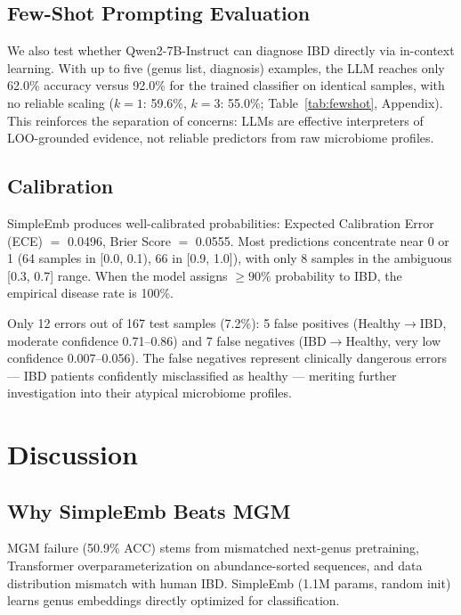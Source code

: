 \documentclass{article} %
\begin{document}
\subsection{Few-Shot Prompting Evaluation}

We also test whether Qwen2-7B-Instruct can diagnose IBD directly via in-context learning. With up to five (genus list, diagnosis) examples, the LLM reaches only 62.0\% accuracy versus 92.0\% for the trained classifier on identical samples, with no reliable scaling ($k{=}1$: 59.6\%, $k{=}3$: 55.0\%; Table~\ref{tab:fewshot}, Appendix). This reinforces the separation of concerns: LLMs are effective interpreters of LOO-grounded evidence, not reliable predictors from raw microbiome profiles.





\subsection{Calibration}

SimpleEmb produces well-calibrated probabilities: Expected Calibration Error (ECE) $=$ 0.0496, Brier Score $=$ 0.0555. Most predictions concentrate near 0 or 1 (64 samples in [0.0, 0.1), 66 in [0.9, 1.0]), with only 8 samples in the ambiguous [0.3, 0.7] range. When the model assigns ${\geq}90\%$ probability to IBD, the empirical disease rate is 100\%.

Only 12 errors out of 167 test samples (7.2\%): 5 false positives (Healthy$\rightarrow$IBD, moderate confidence 0.71--0.86) and 7 false negatives (IBD$\rightarrow$Healthy, very low confidence 0.007--0.056). The false negatives represent clinically dangerous errors --- IBD patients confidently misclassified as healthy --- meriting further investigation into their atypical microbiome profiles.



\section{Discussion}

\subsection{Why SimpleEmb Beats MGM}

MGM failure (50.9\% ACC) stems from mismatched next-genus pretraining, Transformer overparameterization on abundance-sorted sequences, and data distribution mismatch with human IBD. SimpleEmb (1.1M params, random init) learns genus embeddings directly optimized for classification.
\end{document}
